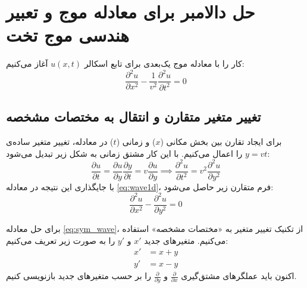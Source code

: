 \documentclass[12pt,a4paper]{article}
\begin{document}
\section{حل دالامبر برای معادله موج و تعبیر هندسی موج تخت}
کار را با معادله موج یک‌بعدی برای تابع اسکالر $u(x,t)$ آغاز می‌کنیم:
\begin{equation} \label{eq:wave1d}
    \frac{\partial^2 u}{\partial x^2} - \frac{1}{v^2} \frac{\partial^2 u}{\partial t^2} = 0
\end{equation}

\subsection{تغییر متغیر متقارن و انتقال به مختصات مشخصه}
برای ایجاد تقارن بین بخش مکانی ($x$) و زمانی ($t$) در معادله، تغییر متغیر ساده‌ی $y = vt$ را اعمال می‌کنیم. با این کار مشتق زمانی به شکل زیر تبدیل می‌شود:
\begin{equation}
    \frac{\partial u}{\partial t} = \frac{\partial u}{\partial y}\frac{\partial y}{\partial t} = v \frac{\partial u}{\partial y} \implies \frac{\partial^2 u}{\partial t^2} = v^2 \frac{\partial^2 u}{\partial y^2}
\end{equation}
با جایگذاری این نتیجه در معادله \eqref{eq:wave1d}، فرم متقارن زیر حاصل می‌شود:
\begin{equation} \label{eq:sym_wave}
    \frac{\partial^2 u}{\partial x^2} - \frac{\partial^2 u}{\partial y^2} = 0
\end{equation}

برای حل معادله \eqref{eq:sym_wave}، از تکنیک تغییر متغیر به «مختصات مشخصه»  استفاده می‌کنیم. متغیرهای جدید $x'$ و $y'$ را به صورت زیر تعریف می‌کنیم:
\begin{align}
    x' &= x + y \label{eq:xp} \\
    y' &= x - y \label{eq:yp}
\end{align}
اکنون باید عملگرهای مشتق‌گیری $\frac{\partial}{\partial x}$ و $\frac{\partial}{\partial y}$ را بر حسب متغیرهای جدید بازنویسی کنیم.
\end{document}
